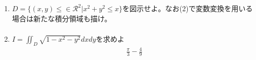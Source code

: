 \documentclass[a4paper,10pt]{jarticle}
\begin{document}
\section{}
\begin{enumerate}
\item $ D=\{(x,y) \leq \in \mathcal{R}^2 | x^2+y^2 \leq x\}$を図示せよ。なお(2)で変数変換を用いる場合は新たな積分領域も描け。
\begin{gather*}
\end{gather*}
\item$ I=\iint_{D} \sqrt{1-x^2-y^2}dxdy$を求めよ
\begin{gather*}
\frac{\pi}{3}-\frac{4}{9}
\end{gather*}
\end{enumerate}
\end{document}
